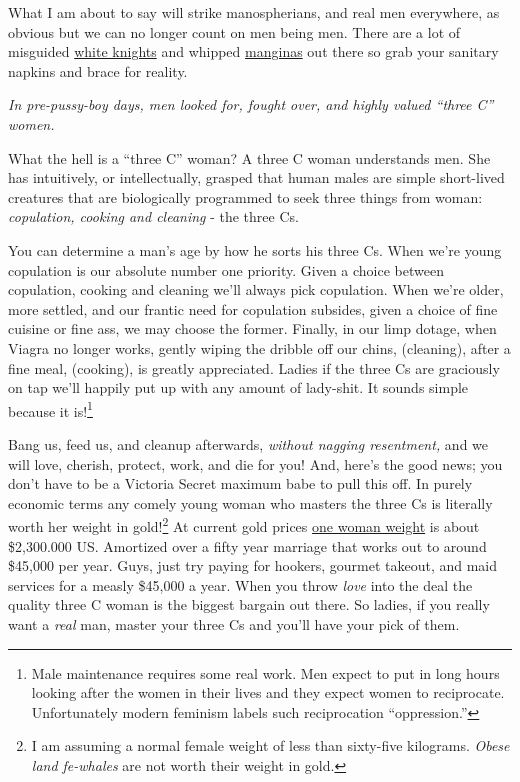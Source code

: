 What I am about to say will strike manospherians, and real men
everywhere, as obvious but we can no longer count on men being men.
There are a lot of misguided
\href{http://www.urbandictionary.com/define.php?term=White+Knight}{white
knights} and whipped
\href{http://rationalwiki.org/wiki/Fun:Mangina}{manginas} out there so
grab your sanitary napkins and brace for reality.

\emph{In pre-pussy-boy days, men looked for, fought over, and highly
valued ``three C'' women.}

What the hell is a ``three C'' woman? A three C woman understands men.
She has intuitively, or intellectually, grasped that human males are
simple short-lived creatures that are biologically programmed to seek
three things from woman: \emph{copulation, cooking and cleaning} - the
three Cs.

You can determine a man's age by how he sorts his three Cs. When we're
young copulation is our absolute number one priority. Given a choice
between copulation, cooking and cleaning we'll always pick copulation.
When we're older, more settled, and our frantic need for copulation
subsides, given a choice of fine cuisine or fine ass, we may choose the
former. Finally, in our limp dotage, when Viagra no longer works, gently
wiping the dribble off our chins, (cleaning), after a fine meal,
(cooking), is greatly appreciated. Ladies if the three Cs are graciously
on tap we'll happily put up with any amount of lady-shit. It sounds
simple because it
is!\footnote{Male maintenance requires some real work. Men expect to put in long
hours looking after the women in their lives and they expect women to
reciprocate. Unfortunately modern feminism labels such reciprocation
``oppression.''}%

Bang us, feed us, and cleanup afterwards, \emph{without nagging
resentment,} and we will love, cherish, protect, work, and die for you!
And, here's the good news; you don't have to be a Victoria Secret
maximum babe to pull this off. In purely economic terms any comely young
woman who masters the three Cs is literally worth her weight in
gold!\footnote{I am assuming a normal female weight of less than sixty-five
kilograms. \emph{Obese land fe-whales} are not worth their weight in
gold.} At %
current gold prices
\href{http://www.wolframalpha.com/input/?i=dollar+value+of+60kg+gold}{one
woman weight} is about \$2,300.000 US. Amortized over a fifty year
marriage that works out to around \$45,000 per year. Guys, just try
paying for hookers, gourmet takeout, and maid services for a measly
\$45,000 a year. When you throw \emph{love} into the deal the quality
three C woman is the biggest bargain out there. So ladies, if you really
want a \emph{real} man, master your three Cs and you'll have your pick
of them.

